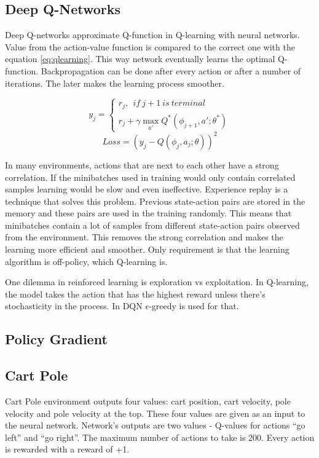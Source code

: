 \subsection{Deep Q-Networks}
Deep Q-networks approximate Q-function in Q-learning with neural networks. Value from the action-value function is compared to the correct one with the equation \ref{eq:qlearning}. This way network eventually learns the optimal Q-function. Backpropagation can be done after every action or after a number of iterations. The later makes the learning process smoother. \cite{mnih2015human}

\begin{equation}
    y_j = \left\{
        \begin{array}{l}
            r_j, \:\: if\:j + 1\:is\:terminal \\
            r_j + \gamma \max_{a'} Q^*(\phi_{j+1},a'; \theta^*)
        \end{array}
    \right.
\end{equation}
\begin{equation}
    \label{eq:msedqn}
    Loss = (y_j - Q(\phi_j, a_j; \theta))^2
\end{equation}

In many environments, actions that are next to each other have a strong correlation. If the minibatches used in training would only contain correlated samples learning would be slow and even ineffective. Experience replay is a technique that solves this problem. Previous state-action pairs are stored in the memory and these pairs are used in the training randomly. This means that minibatches contain a lot of samples from different state-action pairs observed from the environment. This removes the strong correlation and makes the learning more efficient and smoother. Only requirement is that the learning algorithm is off-policy, which Q-learning is.

One dilemma in reinforced learning is exploration vs exploitation. In Q-learning, the model takes the action that has the highest reward unless there’s stochasticity in the process. In DQN $\epsilon$-greedy is used for that.

\subsection{Policy Gradient}

\subsection{Cart Pole}
Cart Pole environment outputs four values: cart position, cart velocity, pole velocity and pole velocity at the top. These four values are given as an input to the neural network. Network’s outputs are two values - Q-values for actions “go left” and “go right”. The maximum number of actions to take is 200. Every action is rewarded with a reward of +1.
